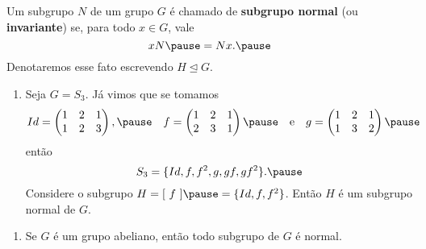 \documentclass{beamer}
\begin{document}
    \begin{frame}
        \begin{definicao}
            Um subgrupo $N$ \pause de um grupo $G$ \pause é chamado de \textbf{subgrupo normal} \pause (ou \textbf{invariante}) \pause se, para todo $x \in G$, \pause vale
            \[
                xN \pause = Nx. \pause
            \]
            Denotaremos esse fato escrevendo $H \unlhd G$.
        \end{definicao}
    \end{frame}

    \begin{frame}
        \begin{exemplos}
            \begin{enumerate}[label=({\arabic*})]
                \item Seja $G = S_3$. \pause Já vimos que se tomamos
                \[
                    Id = \begin{pmatrix}
                        1 & 2 & 1\\
                        1 & 2 & 3
                    \end{pmatrix}, \pause \quad
                    f = \begin{pmatrix}
                        1 & 2 & 1\\
                        2 & 3 & 1
                    \end{pmatrix} \pause \quad \mbox{e}\quad
                    g = \begin{pmatrix}
                        1 & 2 & 1\\
                        1 & 3 & 2
                    \end{pmatrix} \pause
                \]
                então
                \[
                    S_3 = \{Id, f, f^2, g, gf, gf^2\}. \pause
                \]
                Considere o subgrupo $H = [\ f\ ] \pause = \{Id, f, f^2\}$. \pause Então $H$ é um subgrupo normal de $G$.

                \seti
            \end{enumerate}
        \end{exemplos}
    \end{frame}

    \begin{frame}
        \begin{exemplos}
            \begin{enumerate}[label=({\arabic*})]
                \conti

                \item Se $G$ é um grupo abeliano, \pause então todo subgrupo de $G$ é normal.
                
                \seti
            \end{enumerate}
        \end{exemplos}
    \end{frame}
\end{document}
